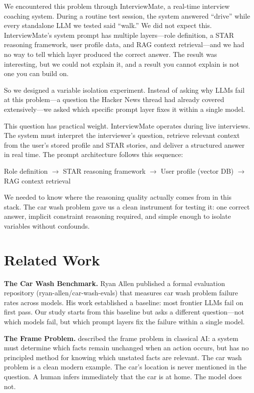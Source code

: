 \documentclass[11pt]{article}
\begin{document}
We encountered this problem through InterviewMate, a real-time interview coaching system. During a routine test session, the system answered ``drive'' while every standalone LLM we tested said ``walk.'' We did not expect this. InterviewMate's system prompt has multiple layers---role definition, a STAR reasoning framework, user profile data, and RAG context retrieval---and we had no way to tell which layer produced the correct answer. The result was interesting, but we could not explain it, and a result you cannot explain is not one you can build on.

So we designed a variable isolation experiment. Instead of asking why LLMs fail at this problem---a question the Hacker News thread had already covered extensively---we asked which specific prompt layer fixes it within a single model.

This question has practical weight. InterviewMate operates during live interviews. The system must interpret the interviewer's question, retrieve relevant context from the user's stored profile and STAR stories, and deliver a structured answer in real time. The prompt architecture follows this sequence:

\begin{center}
Role definition $\rightarrow$ STAR reasoning framework $\rightarrow$ User profile (vector DB) $\rightarrow$ RAG context retrieval
\end{center}

We needed to know where the reasoning quality actually comes from in this stack. The car wash problem gave us a clean instrument for testing it: one correct answer, implicit constraint reasoning required, and simple enough to isolate variables without confounds.

\section{Related Work}

\textbf{The Car Wash Benchmark.} Ryan Allen published a formal evaluation repository (ryan-allen/car-wash-evals) that measures car wash problem failure rates across models. His work established a baseline: most frontier LLMs fail on first pass. Our study starts from this baseline but asks a different question---not which models fail, but which prompt layers fix the failure within a single model.

\textbf{The Frame Problem.} \citet{mccarthy1969} described the frame problem in classical AI: a system must determine which facts remain unchanged when an action occurs, but has no principled method for knowing which unstated facts are relevant. The car wash problem is a clean modern example. The car's location is never mentioned in the question. A human infers immediately that the car is at home. The model does not.
\end{document}
